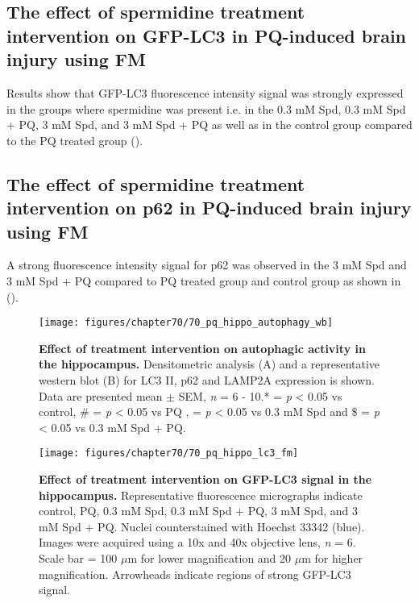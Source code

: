 \subsection{The effect of spermidine treatment intervention on GFP-LC3  in PQ-induced brain injury using FM}
Results show that GFP-LC3 fluorescence intensity signal was strongly expressed in the groups where spermidine was present i.e. in the 0.3 mM Spd, 0.3 mM Spd + PQ, 3 mM Spd, and 3 mM Spd + PQ as well as in the control group compared to the PQ treated group ().

\subsection{The effect of spermidine treatment intervention on p62 in PQ-induced brain injury using FM}
A strong fluorescence intensity signal for p62 was observed in the 3 mM Spd and 3 mM Spd + PQ compared to PQ treated group and control group as shown in ().

\begin{landscape}
\begin{figure}[!htbp]
\center
  \texttt{[image: figures/chapter70/70\_pq\_hippo\_autophagy\_wb]}
  \caption[Effect of treatment intervention on autophagic activity in the hippocampus]{\textbf{Effect of treatment intervention on autophagic activity in the hippocampus.} Densitometric analysis (A) and a representative western blot (B) for LC3 II, p62 and LAMP2A expression is shown. Data are presented  mean $\pm$ SEM, \textit{n} = 6 - 10.* = \textit{p} < 0.05 vs control, \# = \textit{p} < 0.05 vs PQ , \@ = \textit{p} < 0.05 vs 0.3 mM Spd and \$ = \textit{p} < 0.05 vs 0.3 mM Spd + PQ.}
  \label{fig:70_pq_hippo_autophagy_wb}
\end{figure} 
\end{landscape}

\begin{landscape}
\begin{figure}[!htbp]
\center
  \texttt{[image: figures/chapter70/70\_pq\_hippo\_lc3\_fm]}
  \caption[Effect of treatment intervention on GFP-LC3 signal in the hippocampus]{\textbf{Effect of treatment intervention on GFP-LC3 signal in the hippocampus.} Representative fluorescence micrographs indicate control, PQ, 0.3 mM Spd, 0.3 mM Spd + PQ, 3 mM Spd, and 3 mM Spd + PQ. Nuclei counterstained with Hoechst 33342 (blue). Images were acquired using a 10x and 40x objective lens, \textit{n} = 6. Scale bar = 100 $\mu$m for lower magnification and 20 $\mu$m for higher magnification. Arrowheads indicate regions of strong GFP-LC3 signal.}
  \label{fig:70_pq_hippo_lc3_fm}
\end{figure} 
\end{landscape}

